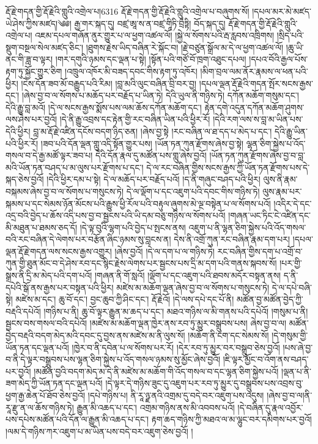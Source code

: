 \setcounter{footnote}{0} 
རྡོ་རྗེ་གདན་གྱི་རྡོ་རྗེའི་གླུའི་འགྲེལ་པ།6316 རྡོ་རྗེ་གདན་གྱི་རྡོ་རྗེའི་གླུའི་འགྲེལ་པ་བཞུགས་སོ། །དཔལ་མར་མེ་མཛད་ཡེ་ཤེས་ཀྱིས་མཛད།༄༅། རྒྱ་གར་སྐད་དུ། བཛྲ་ཨཱ་ས་ན་བཛྲ་གཱིཏི་བྲྀཏྟི། བོད་སྐད་དུ། རྡོ་རྗེ་གདན་གྱི་རྡོ་རྗེའི་གླུའི་འགྲེལ་པ། འཇམ་དཔལ་གཞོན་ནུར་གྱུར་པ་ལ་ཕྱག་འཚལ་ལོ། །སྐྱེ་ལ་སོགས་པའི་རྦ་རླབས་འཁྲིགས། །སྲིད་པའི་སྡུག་བསྔལ་སེལ་མཛད་ཅིང་། །ཐུགས་རྗེས་ཡིད་བཞིན་རེ་སྐོང་བ། །རྗེ་བཙུན་སྒྲོལ་མ་དེ་ལ་ཕྱག་འཚལ་ལོ། །ཆུ་ཡི་ནང་གི་ཟླ་བ་ལྟར། །གར་དགུའི་ཉམས་དང་ལྡན་པ་སྟེ། །སྟོན་པའི་གཙོ་བོ་ཁྲག་འཐུང་དཔལ། །དཔའ་བོའི་རྒྱལ་པོས་རྟག་ཏུ་སྐྱོང་གྱུར་ཅིག །འཁྲུལ་འཁོར་མི་བཟད་དབང་གིས་རྟག་ཏུ་འཁོར། །མིག་བྲལ་ལམ་ནོར་རྣམས་ལ་ཕན་པའི་ཕྱིར། །ངེས་དོན་ཟབ་མོ་བརྒྱུད་པའི་རིམ། །བླ་མའི་ལུང་བཞིན་བྲི་བར་བྱ། །དཔལ་ལྡན་རྡོ་རྗེའི་གདན་སྤོར་སངས་རྒྱས་དང་། །ཞེས་བྱ་བ་ལ་སོགས་པ་མཆོད་པར་བརྗོད་པ་ཡིན་ཏེ། དེའི་ཡུལ་ནི་གཉིས་ཏེ། དཀོན་མཆོག་གསུམ་དང་། དེའི་རྒྱུ་བླ་མའོ། །དེ་ལ་སངས་རྒྱས་སྨོས་པས་ལམ་ཆོས་དཀོན་མཆོག་དང་། རྟེན་དགེ་འདུན་དཀོན་མཆོག་ཤུགས་ལས་ཤེས་པར་བྱའོ། །དེ་ནི་རྒྱུ་འབྲས་དང་རྟེན་གྱི་རང་བཞིན་ཡིན་པའི་ཕྱིར་རོ། །དེའི་རག་ལས་ས་བླ་མ་ཡིན་པས་དེའི་ཕྱིར། བླ་མ་རྡོ་རྗེ་འཛིན་དངོས་བདག་ཉིད་ཅན། །ཞེས་བྱ་སྟེ །རང་བཞིན་ལ་ཐ་དད་པ་མེད་པ་དང་། དེའི་རྒྱུ་ཡིན་པའི་ཕྱིར་རོ། །ཟབ་པའི་དོན་ལྡན་གླུ་འདི་སྟོན་གྱུར་པས། །ཡོན་ཏན་ཀུན་རྫོགས་ཞེས་བྱ་སྟེ། ལྷན་ཅིག་སྐྱེས་པ་འོད་གསལ་བ་དེ་རྒྱ་མཚོ་ལྟར་ཟབ་པ། དེའི་དོན་རྣལ་དུ་མཚོན་པས་གླུ་ཞེས་བྱའོ། །ཡོན་ཏན་ཀུན་རྫོགས་ཞེས་བྱ་བ་བླ་མའི་ཡོན་ཏན་བཤད་པ་མ་ལུས་པར་རྫོགས་པ་དང་། དེ་ལ་རང་བཞིན་གྱིས་སངས་རྒྱས་ཀྱི་ཡོན་ཏན་རྫོགས་པས་དེ་སྐད་ཅེས་བྱའོ། །དེའི་ཕྱིར་དམ་པ་སྟེ། དེ་ལ་མཆོད་པར་བརྗོད་པའོ། །ད་ནི་གཞུང་བཤད་པའི་ཕྱིར། ལུས་ནི་རྣམ་བསྐམས་ཞེས་བྱ་བ་ལ་སོགས་པ་གསུངས་ཏེ། དེ་ལ་ལྡོག་པ་དང་འཇུག་པའི་དབང་གིས་གཉིས་ཏེ། ལུས་རྣམ་པར་སྐམས་པ་དང་སེམས་ཉོན་མོངས་པའི་རྒྱུས་ཕྱི་རོལ་པའི་བརྟུལ་ཞུགས་མེ་ལྔ་བསྟེན་པ་ལ་སོགས་པའོ། །འདིར་དེ་དང་འདྲ་བའི་བྱེད་པ་ཆོས་འདི་པས་བྱ་བ་སྦྱངས་པའི་ཡི་དམ་བཅུ་གཉིས་ལ་སོགས་པའོ། །གཞན་ཡང་ཏིང་ངེ་འཛིན་དང་མི་མཐུན་པ་ཐམས་ཅད་དོ། །དེ་ལྟ་བུའི་ལྷག་པའི་བྱེད་པ་སྤངས་ནས། འཇུག་པ་ནི་ལྷན་ཅིག་སྐྱེས་པའི་འོད་གསལ་བའི་རང་བཞིན་དེ་ལེགས་པར་བརྩོན་ཞིང་ཉམས་སུ་བླངས་ན། དེས་ནི་འགྲོ་ཀུན་རང་བཞིན་རྣམ་དག་པར། །དཔལ་ལྡན་རྡོ་རྗེ་གདན་ལས་སངས་རྒྱས་འགྱུར། །ཞེས་བྱའོ། །དེ་ལ་དག་པ་ལ་གཉིས་ཏེ། རང་བཞིན་གྱིས་དག་པ་འགྲོ་བ་ཀུན་གྱི་ཐུན་མོང་བ་དེ་ཤེས་རབ་དང་སྙིང་རྗེས་ལེགས་པར་སྦྱངས་པས་དྲི་མ་དག་པའི་གནས་སྐབས་སོ། །པར་གྱི་སྒྲས་ནི་དྲི་མ་མེད་པའི་དག་པའོ། །གཞན་ནི་གོ་སླའོ། །ལྡོག་པ་དང་འཇུག་པའི་ཐབས་མདོར་བསྟན་ནས། ད་ནི་དཔེའི་སྒོ་ནས་རྒྱས་པར་བསྟན་པའི་ཕྱིར། མཛེས་མ་མཆོག་ལྡན་ཞེས་བྱ་བ་ལ་སོགས་པ་གསུངས་ཏེ། དེ་ལ་དཔེ་བཞི་སྟེ། མཛེས་མ་དང་། ཆུ་བོ་དང་། བྱང་ཆུབ་ཀྱི་ཤིང་དང་། རྡོ་རྗེའོ། །དེ་ལས་དཔེ་དང་པོ་ནི། མཚོན་བྱ་མཚོན་བྱེད་ཀྱི་བརྡའི་དཔེའོ། །གཉིས་པ་ནི། ཆུ་བོ་ལྟར་རྒྱུན་མ་ཆད་པ་དང་། མཐའ་གཉིས་ལ་མི་གནས་པའི་དཔེའོ། །གསུམ་པ་ནི། སྦྱངས་བས་གསལ་བའི་དཔེའོ། །མཛེས་མ་མཆོག་ལྡན་ཁྱེར་ནས་རབ་ཏུ་མྱུར་བསྒྲུབས་པས། ཞེས་བྱ་བ་ལ། མཚོན་བྱེད་བརྡའི་བདག་མེད་མའི་དབང་དུ་བྱས་ནས་མཛེས་མ་ནི་ལུས་སོ། །མཆོག་ནི་ངག་དང་སེམས་སོ། །དེ་གསུམ་གྱི་ཡོན་ཏན་དང་ལྡན་པའོ། །ཁྱེར་བ་ནི་དབེན་པ་ལ་སོགས་པར་རོ། །དེར་རབ་ཏུ་མྱུར་བར་བསྒྲུབ་ཅེས་བྱའོ། །པས་ཞེ་བྱ་བ་ནི་དེ་ལྟར་བསྒྲུབས་པས་ལྷན་ཅིག་སྐྱེས་པ་འོད་གསལ་ཉམས་སུ་མྱོང་ཞེས་བྱའོ། །ཇི་ལྟར་མྱོང་བ་འོག་ནས་བཤད་པར་བྱའོ། །མཚོན་བྱའི་བདག་མེད་མ་དེ་ནི་མཛེས་མ་མཆོག་གི་འོད་གསལ་བ་དང་ལྷན་ཅིག་སྐྱེས་པའོ། །ལྡན་པ་ནི་ཟག་མེད་ཀྱི་ཡོན་ཏན་དང་ལྡན་པའོ། །དེ་ལྟར་དེ་གཉིས་ཟུང་དུ་འཇུག་པར་རབ་ཏུ་མྱུར་དུ་བསྒྲུབས་པས་འབྲས་བུ་ཕྱག་རྒྱ་ཆེན་པོ་ཐོབ་ཅེས་བྱའོ། །དཔེ་གཉིས་པ། ནི་རཱ་ཉྫ་ནའི་འགྲམ་དུ་བདེ་བར་འཇུག་པས་འདུས། །ཞེས་བྱ་བ་ལ།ནི་རཱ་རྫུ་ན་ལ་ཆོས་གཉིས་ཏེ། རྒྱུན་མི་འཆད་པ་དང་། འགྲམ་གཉིས་ནས་མི་འབབས་པའོ། །དེ་བཞིན་དུ་རྣལ་འབྱོར་པས་དཔེས་མཚོན་པའི་དོན་ལ་རྒྱུན་མི་འཆད་པ་དང་། རྟག་ཆད་གཉིས་ཀྱི་མཐའ་ལ་མ་ལྷུང་བར་དམིགས་པར་བྱའོ། །ལམ་དེ་གཉིས་ཀར་འཇུག་པ་མ་ཡིན་པས་བདེ་བར་འཇུག་ཅེས་བྱའོ། །
